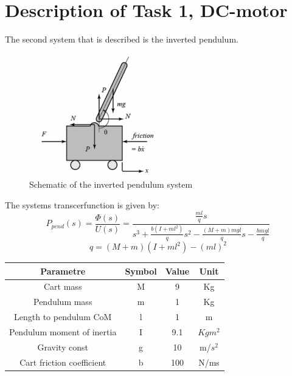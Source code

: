 \section{Description of Task 1, DC-motor}

The second system that is described is the inverted pendulum.

\begin{figure}[h]
    \centering
    \includegraphics[width = 0.5\textwidth]{Images/InvPendulum.png}
    \caption{Schematic of the inverted pendulum system}
    \label{fig:InvPendulum}
\end{figure}

The systems transcerfunction is given by:
\begin{equation}
    P_{pend}(s) = \frac{\Phi (s)}{U(s)} = \frac{\frac{ml}{q} s}{s^3 + \frac{b(I+ml^2)}{q}s^2 - \frac{(M+m)mgl}{q} s - \frac{bmgl}{q} }
\end{equation}
\begin{equation}
    q = (M+m)(I+ml^2)-(ml)^2
\end{equation}

\begin{center}
\begin{tabular}{ |c|c|c|c|}

\hline
Parametre & Symbol & Value & Unit \\
\hline
Cart mass & M & 9 & Kg\\ 
\hline
Pendulum mass & m & 1 & Kg \\  
\hline
Length to pendulum CoM & l & 1 & m \\
\hline
Pendulum moment of inertia & I & 9.1 & $Kgm^2$ \\
\hline
Gravity const & g & 10 & m/$s^2$ \\
\hline
Cart friction coefficient & b & 100 & N/ms \\
\hline
\end{tabular}
\label{tab:Parameters}
\end{center}